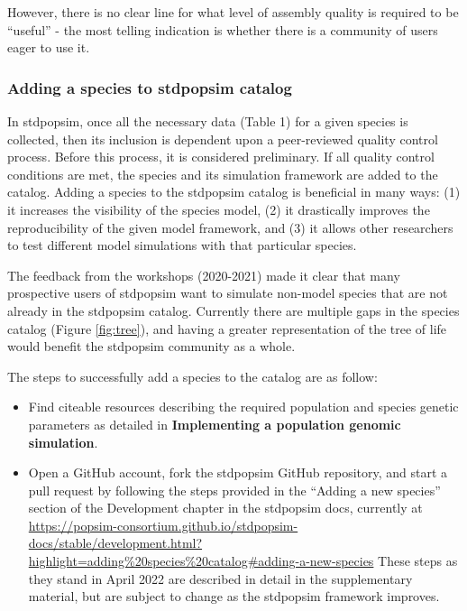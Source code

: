 \documentclass[hidelinks]{article}
\providecommand{\tightlist}{%
\setlength{\itemsep}{0pt}\setlength{\parskip}{0pt}}
\begin{document}
However, there is no clear line for what level of assembly quality is
required to be ``useful'' - the most telling indication is whether there is
a community of users eager to use it.

\hypertarget{adding-a-species-to-stdpopsim-catalog}{%
\subsubsection*{Adding a species to stdpopsim
catalog}\label{adding-a-species-to-stdpopsim-catalog}}

In stdpopsim, once all the necessary data (Table 1) for a given species
is collected, then its inclusion is dependent upon a peer-reviewed
quality control process. Before this process, it is considered preliminary. 
If all quality control conditions are met, the
species and its simulation framework are added to the catalog. Adding a
species to the stdpopsim catalog is beneficial in many ways: (1) it
increases the visibility of the species model, (2) it drastically
improves the reproducibility of the given model framework, and (3) it
allows other researchers to test different model simulations with that
particular species.

The feedback from the workshops (2020-2021) made
it clear that many prospective users of stdpopsim want to simulate
non-model species that are not already in the stdpopsim catalog.
Currently there are multiple gaps in the species catalog (Figure \ref{fig:tree}), 
and having a greater representation of the tree of life would benefit 
the stdpopsim community as a whole.

The steps to successfully add a species to the catalog are as follow:

\begin{itemize}
\tightlist
\item
  Find citeable resources describing the required population and species
  genetic parameters as detailed in \textbf{Implementing a population genomic simulation}.
\item
  Open a GitHub account, fork the stdpopsim GitHub
  repository, and start a pull request by following the steps provided
  in the ``Adding a new species'' section of the Development chapter in
  the stdpopsim docs, currently at
  \url{https://popsim-consortium.github.io/stdpopsim-docs/stable/development.html?highlight=adding\%20species\%20catalog\#adding-a-new-species}
  These steps as they stand in April 2022 are described in detail in the
  supplementary material, but are subject to change as the stdpopsim
  framework improves.
\end{itemize}
\end{document}
